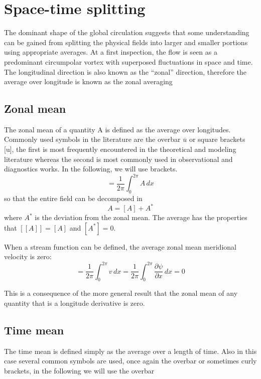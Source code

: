 \section{Space-time splitting}
The dominant shape of the global circulation suggests that some understanding can be gained from splitting the physical fields into larger and smaller portions using appropriate averages. At a first inspection, the flow is seen as a predominant circumpolar vortex with superposed fluctuations in space and time. The longitudinal direction is also known as the “zonal” direction, therefore the average over longitude is known as the zonal averaging 

\subsection{Zonal mean}
The zonal mean of a quantity A is defined as the average over longitudes. Commonly used symbols in the literature are the overbar $\overline{u}$ or square brackets [u], the first is most frequently encountered in the theoretical and modeling literature whereas the second is most commonly used in observational and diagnostics works. In the following, we will use brackets. 
\begin{equation}
    [A] = \frac{1}{2\pi}\int_0^{2\pi} A \, dx
\end{equation}
so that the entire field can be decomposed in
  \begin{equation}
    A = [A] + A^*
\end{equation}
where $A^*$ is the deviation from the zonal mean. 
 The average has the properties that \([[A]] = [A]\) and \([A^*]=0\).

When a stream function can be defined, the average zonal mean meridional
velocity is zero:
\begin{equation}
    = \frac{1}{2\pi}\int_0^{2\pi} v \, dx=\frac{1}{2\pi}\int_0^{2\pi} \frac{\partial \psi}{\partial x} \, dx=0
\end{equation}


This is a consequence of the more general result that the zonal mean of
any quantity that is a longitude derivative is zero.

\subsection{Time mean}
The time mean is defined simply as the average over a length of time.
Also in this case several common symbols are used, once again the
overbar or sometimes curly brackets, in the following we will use the
overbar


